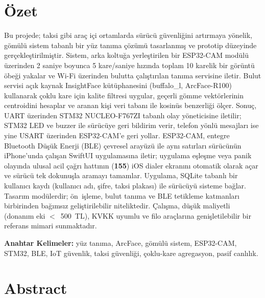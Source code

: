 \chapter*{Özet}

Bu projede; taksi gibi araç içi ortamlarda sürücü güvenliğini artırmaya
yönelik, gömülü sistem tabanlı bir yüz tanıma çözümü tasarlanmış ve
prototip düzeyinde gerçekleştirilmiştir. Sistem, arka koltuğa yerleştirilen
bir ESP32-CAM modülü üzerinden 2 saniye boyunca 5 kare/saniye hızında
toplam 10 karelik bir görüntü öbeği yakalar ve Wi-Fi üzerinden bulutta
çalıştırılan tanıma servisine iletir. Bulut servisi açık kaynak
InsightFace kütüphanesini (buffalo\_l, ArcFace-R100) kullanarak çoklu
kare için kalite filtresi uygular, geçerli gömme vektörlerinin
centroidini hesaplar ve aranan kişi veri tabanı ile kosinüs benzerliği
ölçer. Sonuç, UART üzerinden STM32 NUCLEO-F767ZI tabanlı olay
yöneticisine iletilir; STM32 LED ve buzzer ile sürücüye geri bildirim
verir, telefon yönlü mesajları ise yine USART üzerinden ESP32-CAM'e
geri yollar. ESP32-CAM, entegre Bluetooth Düşük Enerji (BLE) çevresel
arayüzü ile aynı satırları sürücünün iPhone'unda çalışan SwiftUI
uygulamasına iletir; uygulama eşleşme veya panik olayında ulusal acil
çağrı hattının (\textbf{155}) iOS dialer ekranını otomatik olarak açar
ve sürücü tek dokunuşla aramayı tamamlar. Uygulama, SQLite tabanlı bir
kullanıcı kaydı (kullanıcı adı, şifre, taksi plakası) ile sürücüyü
sisteme bağlar. Tasarım modülerdir; ön~işleme, bulut tanıma ve BLE
tetikleme katmanları birbirinden bağımsız geliştirilebilir niteliktedir.
Çalışma, düşük maliyetli (donanım eki $<$~500~TL), KVKK uyumlu ve filo
araçlarına genişletilebilir bir referans mimari sunmaktadır.

\noindent\textbf{Anahtar Kelimeler:} yüz tanıma, ArcFace, gömülü sistem,
ESP32-CAM, STM32, BLE, IoT güvenlik, taksi güvenliği, çoklu-kare
agregasyon, pasif canlılık.

\vspace{1cm}

\chapter*{Abstract}

